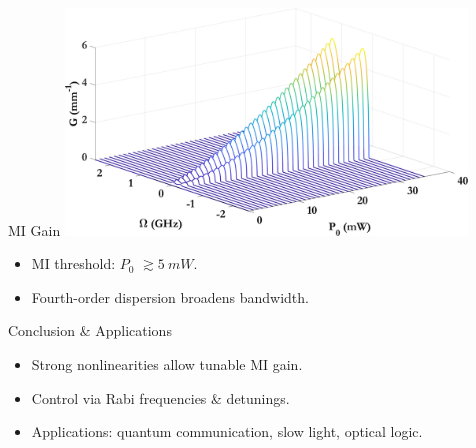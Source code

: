 \documentclass{beamer}
\begin{document}
\begin{frame}{MI Gain}
  \vspace{-22pt}
  \hspace*{32pt}
  \includegraphics[width=0.8\textwidth]{Assets/Beta2_Kerr.jpeg}
  \begin{itemize}
    \item MI threshold: $P_0$ $\gtrsim 5\ mW$.
    \item Fourth-order dispersion broadens bandwidth.
  \end{itemize}
\end{frame}

\begin{frame}{Conclusion \& Applications}
  \begin{itemize}
    \item Strong nonlinearities allow tunable MI gain.
    \item Control via Rabi frequencies \& detunings.
    \item Applications: quantum communication, slow light, optical logic.
  \end{itemize}
\end{frame}
\end{document}
